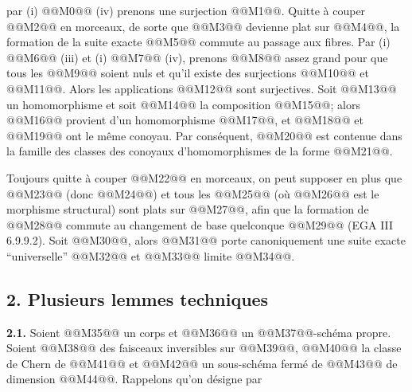 
par (i) @@M0@@ (iv) prenons une surjection @@M1@@. Quitte à couper @@M2@@ en morceaux, de sorte que @@M3@@ devienne plat sur @@M4@@, la formation de la suite exacte @@M5@@ commute au passage aux fibres. Par (i) @@M6@@ (iii) et (i) @@M7@@ (iv), prenons @@M8@@ assez grand pour que tous les @@M9@@ soient nuls et qu'il existe des surjections @@M10@@ et @@M11@@. Alors les applications @@M12@@ sont surjectives. Soit @@M13@@ un homomorphisme et soit @@M14@@ la composition @@M15@@; alors @@M16@@ provient d'un homomorphisme @@M17@@, et @@M18@@ et @@M19@@ ont le même conoyau. Par conséquent, @@M20@@ est contenue dans la famille des classes des conoyaux d'homomorphismes de la forme @@M21@@.

Toujours quitte à couper @@M22@@ en morceaux, on peut supposer en plus que @@M23@@ (donc @@M24@@) et tous les @@M25@@ (où @@M26@@ est le morphisme structural) sont plats sur @@M27@@, afin que la formation de @@M28@@ commute au changement de base quelconque @@M29@@ (EGA III 6.9.9.2). Soit @@M30@@, alors @@M31@@ porte canoniquement une suite exacte ``universelle''
@@M32@@
et @@M33@@ limite @@M34@@.

\subsection*{2. Plusieurs lemmes techniques}
\textbf{2.1.} Soient @@M35@@ un corps et @@M36@@ un @@M37@@-schéma propre. Soient @@M38@@ des faisceaux inversibles sur @@M39@@, @@M40@@ la classe de Chern de @@M41@@ et @@M42@@ un sous-schéma fermé de @@M43@@ de dimension @@M44@@. Rappelons qu'on désigne par
